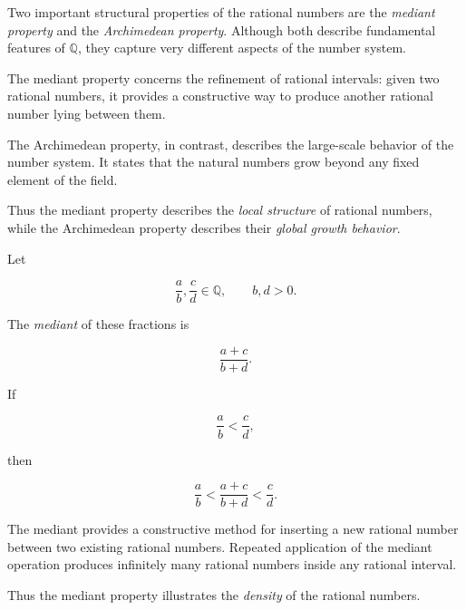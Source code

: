 \begin{remark}
\label{rem:mediant-archimedean-teacher}

Two important structural properties of the rational numbers are the
\emph{mediant property} and the \emph{Archimedean property}.  Although
both describe fundamental features of $\mathbb{Q}$, they capture very
different aspects of the number system.

The mediant property concerns the refinement of rational intervals:
given two rational numbers, it provides a constructive way to produce
another rational number lying between them.

The Archimedean property, in contrast, describes the large-scale
behavior of the number system.  It states that the natural numbers
grow beyond any fixed element of the field.

Thus the mediant property describes the \emph{local structure} of
rational numbers, while the Archimedean property describes their
\emph{global growth behavior}.

\end{remark}


\begin{definition}[Mediant]
\label{def:mediant}

Let

\[
\frac{a}{b}, \frac{c}{d} \in \mathbb{Q},
\qquad b,d>0.
\]

The \emph{mediant} of these fractions is

\[
\frac{a+c}{b+d}.
\]

\end{definition}

\begin{theorem}
\label{thm:mediant-inequality}

If

\[
\frac{a}{b} < \frac{c}{d},
\]

then

\[
\frac{a}{b}
<
\frac{a+c}{b+d}
<
\frac{c}{d}.
\]

\end{theorem}

\begin{remark}

The mediant provides a constructive method for inserting a new
rational number between two existing rational numbers.  Repeated
application of the mediant operation produces infinitely many
rational numbers inside any rational interval.

Thus the mediant property illustrates the \emph{density} of the
rational numbers.

\end{remark}


